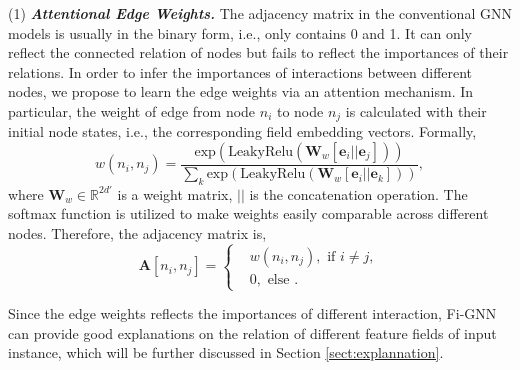 \documentclass[sigconf]{acmart}
\begin{document}
(1) \textit{\textbf{Attentional Edge Weights.}}
The adjacency matrix in the conventional GNN models is usually in the binary form, i.e., only contains 0 and 1.
It can only reflect the connected relation of nodes but fails to reflect the importances of their relations.
In order to infer the importances of interactions between different nodes, we propose to learn the edge weights via an attention mechanism.
In particular, the weight of edge from node $n_{i}$ to node $n_{j}$ is calculated with their initial node states, i.e., the corresponding field embedding vectors.
Formally,
\begin{equation} \label{uniform_A}
w(n_{i}, n_{j}) = \frac{\text{exp}(\text{LeakyRelu}(\mathbf{W}_{w} \left [ \mathbf{e}_{i} \left |  \right | \mathbf{e}_{j} \right ])) }{\sum_{k} \text{exp}(\text{LeakyRelu}(\mathbf{W}_{w} \left [ \mathbf{e}_{i} \left |  \right | \mathbf{e}_{k} \right ]))},
\end{equation}
where $\mathbf{W}_{w} \in \mathbb{R}^{2d'}$ is a weight matrix, $\left |  \right |$ is the concatenation operation.
The softmax function is utilized to make weights easily comparable across different nodes.
Therefore, the adjacency matrix is,
\begin{equation} \label{a}
\mathbf{A}[n_{i}, n_{j}]=\begin{cases}
 & w(n_{i}, n_{j}),  \text{ if } i \neq j, \\
 & 0, \text{ else }.
\end{cases}
\end{equation}


Since the edge weights reflects the importances of different interaction, Fi-GNN can provide good explanations on the relation of different feature fields of input instance, which will be further discussed in Section \ref{sect:explannation}.


       
\end{document}

